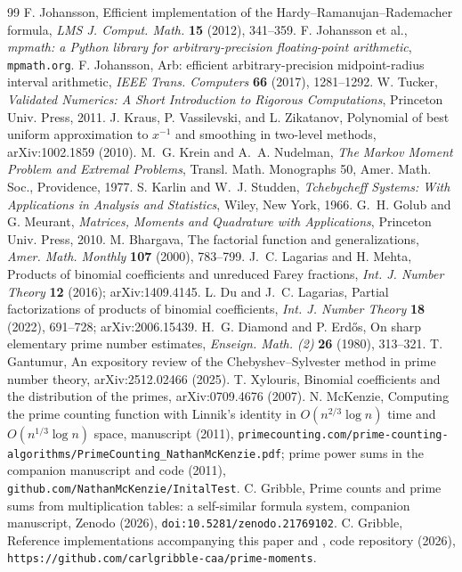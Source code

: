 \documentclass[11pt]{article}
\theoremstyle{remark}
\begin{document}
\begin{thebibliography}{99}
 F. Johansson, Efficient implementation of the Hardy--Ramanujan--Rademacher
formula, \emph{LMS J. Comput. Math.} \textbf{15} (2012), 341--359.
 F. Johansson et al., \emph{mpmath: a Python library for arbitrary-precision
floating-point arithmetic}, \texttt{mpmath.org}.
 F. Johansson, Arb: efficient arbitrary-precision midpoint-radius interval arithmetic,
\emph{IEEE Trans. Computers} \textbf{66} (2017), 1281--1292.
 W. Tucker, \emph{Validated Numerics: A Short Introduction to Rigorous
Computations}, Princeton Univ. Press, 2011.
 J. Kraus, P. Vassilevski, and L. Zikatanov, Polynomial of best uniform approximation to
$x^{-1}$ and smoothing in two-level methods, arXiv:1002.1859 (2010).
 M.~G. Krein and A.~A. Nudelman, \emph{The Markov Moment Problem and Extremal Problems},
Transl. Math. Monographs 50, Amer. Math. Soc., Providence, 1977.
 S. Karlin and W.~J. Studden, \emph{Tchebycheff Systems: With Applications in Analysis
and Statistics}, Wiley, New York, 1966.
 G.~H. Golub and G. Meurant, \emph{Matrices, Moments and Quadrature with Applications},
Princeton Univ. Press, 2010.
 M. Bhargava, The factorial function and generalizations, \emph{Amer. Math.
Monthly} \textbf{107} (2000), 783--799.
 J.~C. Lagarias and H. Mehta, Products of binomial coefficients and unreduced Farey
fractions, \emph{Int. J. Number Theory} \textbf{12} (2016); arXiv:1409.4145.
 L. Du and J.~C. Lagarias, Partial factorizations of products of binomial coefficients,
\emph{Int. J. Number Theory} \textbf{18} (2022), 691--728; arXiv:2006.15439.
 H.~G. Diamond and P. Erd\H{o}s, On sharp elementary prime number estimates,
\emph{Enseign. Math. (2)} \textbf{26} (1980), 313--321.
 T. Gantumur, An expository review of the Chebyshev--Sylvester method in prime
number theory, arXiv:2512.02466 (2025).
 T. Xylouris, Binomial coefficients and the distribution of the primes,
arXiv:0709.4676 (2007).
 N. McKenzie, Computing the prime counting function with Linnik's identity in
$O(n^{2/3} \log n)$ time and $O(n^{1/3} \log n)$ space, manuscript (2011),
\texttt{primecounting.com/prime-counting-algorithms/}\allowbreak\texttt{PrimeCounting\_NathanMcKenzie.pdf}; prime power
sums in the companion manuscript and code (2011), \texttt{github.com/NathanMcKenzie/InitalTest}.
 C. Gribble, Prime counts and prime sums from multiplication tables: a
self-similar formula system, companion manuscript, Zenodo (2026), \texttt{doi:10.5281/zenodo.21769102}.
 C. Gribble, Reference implementations accompanying this paper and \cite{Companion},
code repository (2026), \texttt{https://github.com/carlgribble-caa/prime-moments}.
\end{thebibliography}
\end{document}
